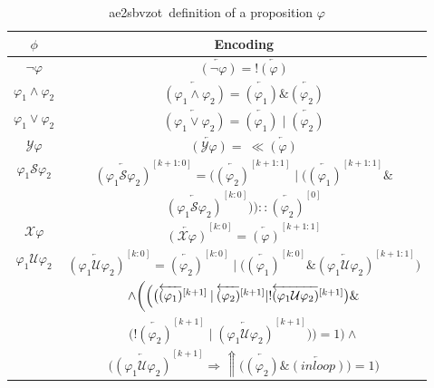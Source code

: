 \documentclass[a4paper,12pt]{article}
\newcommand*\BitAnd{\mathbin{\&}}
\newcommand*\BitOr{\mathbin{|}}
\newcommand{\BitNeg}{!}
\newcommand{\aez}{ae2sbvzot}
\begin{document}
\begin{table}
  \centering
  \caption{\aez\ definition of a proposition \(\varphi\)}
  \begin{tabular}{c c}
    \(\phi\) & Encoding \\
    \midrule
    \(\neg \varphi\)                & \(\overleftarrow{(\neg \varphi)} =\BitNeg\overleftarrow{(\varphi)}\) \\
    \(\varphi_{1} \land \varphi_{2}\)& \(\overleftarrow{(\varphi_{1} \land \varphi_{2})} = \overleftarrow{(\varphi_{1})} \BitAnd \overleftarrow{(\varphi_{2})} \) \\
    \(\varphi_{1} \lor \varphi_{2}\)& \(\overleftarrow{(\varphi_{1} \lor \varphi_{2})} = \overleftarrow{(\varphi_{1})} \BitOr \overleftarrow{(\varphi_{2})} \) \\
    \midrule
    \(\mathcal{Y}\varphi\)         & \(\overleftarrow{(\mathcal{Y}\varphi)} =\ \ll \overleftarrow{(\varphi)}\) \\
    \(\varphi_{1}\mathcal{S}\varphi_{2}\) & \( \overleftarrow{(\varphi_{1}\mathcal{S}\varphi_{2})}^{[k{+}1:0]} = \biggl(\overleftarrow{(\varphi_{2})}^{[k{+}1:1]} \BitOr \bigl( \overleftarrow{(\varphi_{1})}^{[k{+}1:1]} \BitAnd \) \\
             & \(\overleftarrow{(\varphi_{1}\mathcal{S}\varphi_{2})}^{[k:0]}\bigr) \biggr) :: \overleftarrow{(\varphi_{2})}^{[0]} \) \\
    \(\mathcal{X} \varphi\)        & \(\overleftarrow{(\mathcal{X}\varphi)}^{[k:0]} = \overleftarrow{(\varphi)}^{[k{+}1:1]} \) \\
    \(\varphi_{1} \mathcal{U} \varphi_{2}\) & \(\overleftarrow{(\varphi_{1} \mathcal{U} \varphi_{2})}^{[k:0]} = \overleftarrow{(\varphi_{2})}^{[k:0]} \BitOr \bigl( \overleftarrow{(\varphi_{1})}^{[k:0]} \BitAnd \overleftarrow{(\varphi_{1} \mathcal{U} \varphi_{2})}^{[k{+}1:1]} \bigr) \) \\
             & \(\land \biggl( \Bigl( \big( \overleftarrow{(\varphi_{1})}^{[k{+}1]} \BitOr \overleftarrow{(\varphi_{2})}^{[k{+}1]} \BitOr \BitNeg\overleftarrow{(\varphi_{1} \mathcal{U} \varphi_{2})}^{[k{+}1]} \big) \BitAnd\) \\
             & \( \big( !\overleftarrow{(\varphi_{2})}^{[k{+}1]} \BitOr \overleftarrow{(\varphi_{1} \mathcal{U} \varphi_{2})}^{[k{+}1]}\big) \Bigr) = 1 \biggr) \land \) \\
    & \( \big( \overleftarrow{(\varphi_{1} \mathcal{U} \varphi_{2})}^{[k{+}1]} \Rightarrow \Uparrow \bigl( \overleftarrow{(\varphi_{2})} \BitAnd \overleftarrow{(inloop)} \bigr) = 1 \big) \)

  \end{tabular}
  \label{table:zot-constraints}
 \end{table}
\end{document}
